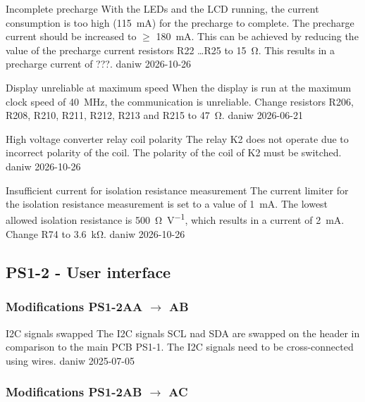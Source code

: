 \begin{ModTable}
\ModItemDone
{Incomplete precharge}
{With the LEDs and the LCD running, the current consumption is too high (\qty{115}{\milli\ampere}) for the precharge to complete. }
{The precharge current should be increased to $\geq$ \qty{180}{\milli\ampere}. This can be achieved by reducing the value of the precharge current resistors R22 \ldots R25 to \qty{15}{\ohm}. This results in a precharge current of ???. }
{daniw}
{2026-10-26}

\ModItemDone
{Display unreliable at maximum speed}
{When the display is run at the maximum clock speed of \qty{40}{\mega\hertz}, the communication is unreliable. }
{Change resistors R206, R208, R210, R211, R212, R213 and R215 to \qty{47}{\ohm}. }
{daniw}
{2026-06-21}

\ModItemDone
{High voltage converter relay coil polarity}
{The relay K2 does not operate due to incorrect polarity of the coil. }
{The polarity of the coil of K2 must be switched. }
{daniw}
{2026-10-26}

\ModItemDone
{Insufficient current for isolation resistance measurement}
{The current limiter for the isolation resistance measurement is set to a value of \qty{1}{\milli\ampere}. The lowest allowed isolation resistance is \qty{500}{\ohm\per\volt}, which results in a current of \qty{2}{\milli\ampere}. }
{Change R74 to \qty{3.6}{\kilo\ohm}. }
{daniw}
{2026-10-26}

\end{ModTable}

\FloatBarrier

\subsection{PS1-2 - User interface}

\subsubsection{Modifications PS1-2AA $\to$ AB}

\begin{ModTable}

\ModItemDone
{\acs{I2C} signals swapped}
{The \ac{I2C} signals SCL nad SDA are swapped on the header in comparison to the main PCB PS1-1. }
{The \ac{I2C} signals need to be cross-connected using wires. }
{daniw}
{2025-07-05}

\end{ModTable}

\FloatBarrier

\subsubsection{Modifications PS1-2AB $\to$ AC}

